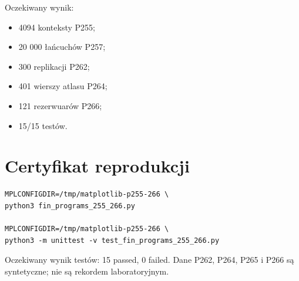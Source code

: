 \documentclass[11pt,a4paper,openany]{report}
\begin{document}
Oczekiwany wynik:

\begin{itemize}
\item 
4094 konteksty P255;

\item 
20 000 łańcuchów P257;

\item 
300 replikacji P262;

\item 
401 wierszy atlasu P264;

\item 
121 rezerwuarów P266;

\item 
15/\allowbreak{}15 testów.

\end{itemize}


\clearpage
\chapter*{Certyfikat reprodukcji}
\begin{Verbatim}[fontsize=\small]
MPLCONFIGDIR=/tmp/matplotlib-p255-266 \
python3 fin_programs_255_266.py

MPLCONFIGDIR=/tmp/matplotlib-p255-266 \
python3 -m unittest -v test_fin_programs_255_266.py
\end{Verbatim}
Oczekiwany wynik testów: 15 passed, 0 failed.  Dane P262, P264, P265 i P266
są syntetyczne; nie są rekordem laboratoryjnym.
\end{document}
